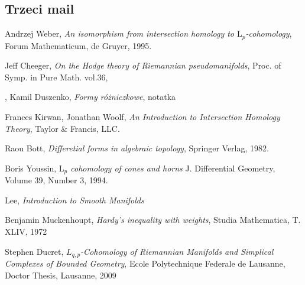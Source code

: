 \documentclass[licencjacka]{pracamgr}
\theoremstyle{definition}
\theoremstyle{definition}
\theoremstyle{plain}
\theoremstyle{plain}
\theoremstyle{plain}
\theoremstyle{plain}
\begin{document}
\subsection{Trzeci mail}




\begin{thebibliography}{99}

 Andrzej Weber, \textit{An isomorphism from
  intersection homology to $\mathrm{L}_p$-cohomology}, Forum
  Mathematicum, de Gruyer, 1995.
  
 Jeff Cheeger, \textit{On the Hodge theory
  of Riemannian pseudomanifolds}, Proc. of Symp. in Pure Math. vol.36,

, Kamil Duszenko, \textit{Formy różniczkowe},
notatka

 Frances Kirwan, Jonathan Woolf, \textit{An Introduction
to Intersection Homology Theory}, Taylor \& Francis, LLC.

 Raou Bott, \textit{Differetial forms in algebraic
  topology}, Springer Verlag, 1982.

 Boris Youssin, \textit{$\mathrm{L}_p$
  cohomology of cones and horns } J. Differential Geometry, Volume 39,
  Number 3, 1994.
  
 Lee, \textit{Introduction to Smooth Manifolds}

 Benjamin Muckenhoupt, \textit{Hardy's inequality
with weights}, Studia Mathematica, T. XLIV, 1972

 Stephen Ducret, \textit{$L_{q,p}$-Cohomology of Riemannian
    Manifolds and Simplical Complexes of Bounded Geometry}, Ecole Polytechnique Federale
    de Lausanne, Doctor Thesis, Lausanne, 2009

\end{thebibliography}
\end{document}
